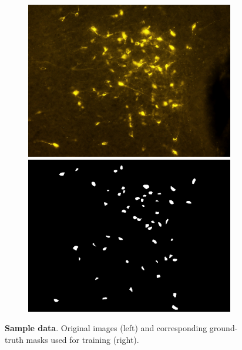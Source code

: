\begin{figure}
\centering
\begin{subfigure}{1.1\textwidth}
\includegraphics[width=0.5\linewidth]{figures/120_dataset/i_257.jpeg}
\includegraphics[width=0.5\linewidth]{figures/120_dataset/m_257.png}
\subcaption{}
\label{fig:dataset:bright}
\end{subfigure}
\vspace{-0.2cm}
\caption{
\textbf{Sample data}. 
Original images (left) and corresponding ground-truth masks used for training (right).
} \label{fig:dataset}
\end{figure}%
